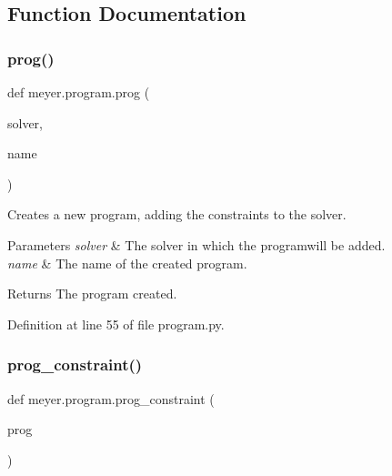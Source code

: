 \subsection{Function Documentation}
\mbox{\label{namespacemeyer_1_1program_a2ec2977de2aefb152624161860abed00}} 
\subsubsection{\texorpdfstring{prog()}{prog()}}
{\footnotesize\ttfamily def meyer.\+program.\+prog (\begin{DoxyParamCaption}\item[{}]{solver,  }\item[{}]{name }\end{DoxyParamCaption})}



Creates a new program, adding the constraints to the solver. 


\begin{DoxyParams}{Parameters}
{\em solver} & The solver in which the programwill be added. \\
\hline
{\em name} & The name of the created program. \\
\hline
\end{DoxyParams}
\begin{DoxyReturn}{Returns}
The program created. 
\end{DoxyReturn}


Definition at line 55 of file program.\+py.

\mbox{\label{namespacemeyer_1_1program_a2229fec0fdbcba6e277f26f537088c21}} 
\subsubsection{\texorpdfstring{prog\+\_\+constraint()}{prog\_constraint()}}
{\footnotesize\ttfamily def meyer.\+program.\+prog\+\_\+constraint (\begin{DoxyParamCaption}\item[{}]{prog }\end{DoxyParamCaption})}




